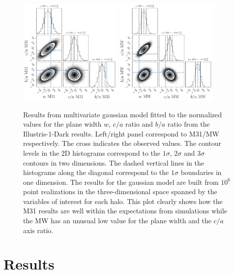 \documentclass[a4paper,fleqn,usenatbib]{mnras}
\begin{document}
\begin{figure}
\centering
\includegraphics[width=0.45\textwidth]{gaussian_model_illustris1dark_M31_n_11.pdf}
\includegraphics[width=0.45\textwidth]{gaussian_model_illustris1dark_MW_n_11.pdf}
\caption{Results from multivariate gaussian model fitted to the
  normalized values for the plane width $w$, $c/a$ ratio and $b/a$
  ratio from the Illustris-1-Dark results.  
  Left/right panel correspond to M31/MW respectively.  
  The cross indicates the observed values.
  The contour levels in the 2D histograms correspond to the $1\sigma$,
$2\sigma$ and $3\sigma$ contours in two dimensions.
  The dashed vertical lines in the histograms along the diagonal
  correspond to the $1\sigma$ boundaries in one dimension.
  The results for the gaussian model are built from $10^6$ point
  realizations in the three-dimensional space spanned by the variables of
  interest for each halo. 
  This plot clearly shows how the M31 results are well within the
  expectations from simulations while the MW has an unusual low value for
  the plane width and the $c/a$ axis ratio.
\label{fig:correlations_illustrisdm}}
\end{figure}


\section{Results}
\label{sec:results}
\end{document}
